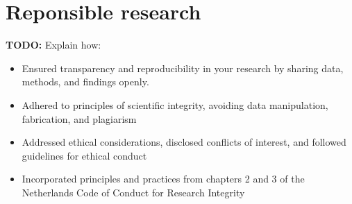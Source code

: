\section{Reponsible research}
\textbf{TODO:}
Explain how:
\begin{itemize}
    \item Ensured transparency and reproducibility in your research by sharing data, methods, and findings
    openly.
    \item Adhered to principles of scientific integrity, avoiding data manipulation, fabrication, and
    plagiarism
    \item Addressed ethical considerations, disclosed conflicts of interest, and followed guidelines for
    ethical conduct
    \item Incorporated principles and practices from chapters 2 and 3 of the Netherlands Code of Conduct
    for Research Integrity
\end{itemize}